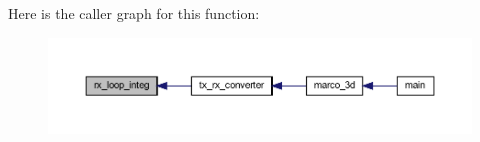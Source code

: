 Here is the caller graph for this function\+:
\nopagebreak
\begin{figure}[H]
\begin{center}
\leavevmode
\includegraphics[width=350pt]{Marco_8f90_aa1520a05c04ebda2383af68c66824efe_icgraph}
\end{center}
\end{figure}
\mbox{\label{Marco_8f90_ab114795afedfc64f5732cc167cf0861a}} 

